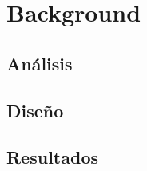 
\chapter{Background} %

\label{Chapter3} %


\section{Análisis}
\lipsum

\section{Diseño}
\lipsum

\section{Resultados}
\lipsum
